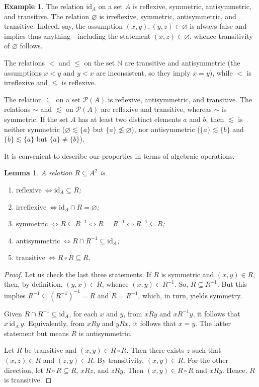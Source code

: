 \documentclass[12pt,notitlepage]{article}
\theoremstyle{plain}
\newtheorem{lemma}[thm]{Lemma}
\theoremstyle{definition}
\newtheorem{exm}[thm]{Example}
\theoremstyle{plain}
\newcommand{\N}{\mathbb{N}}
\newcommand{\sbs}{\subseteq}
\newcommand{\void}{\varnothing}
\newcommand{\mP}{\mathcal{P}}
\newcommand{\id}{\mathrm{id}}
\newcommand{\1}{\mathbf{1}}
\newcommand{\0}{\mathbf{0}}
\begin{document}
\begin{exm}
The relation $\id_A$ on a set $A$ is reflexive, symmetric, antisymmetric, and transitive. The relation $\void$ is irreflexive, symmetric, antisymmetric, and transitive. Indeed, say, the assumption $(x,y), (y,z) \in \void$ is always false and implies thus anything---including the statement $(x,z) \in \void$, whence transitivity of $\void$ follows.


The relations ${<}$ and ${\leq}$ on the set $\N$ are transitive and antisymmetric (the assumptions $x < y$ and $y < x$ are inconsistent, so they imply $x = y$), while ${<}$ is irreflexive and ${\leq}$ is reflexive.

The relation ${\sbs}$ on a set $\mP(A)$ is reflexive, antisymmetric, and transitive. The relations ${\sim}$ and ${\lesssim}$ on $\mP(A)$ are reflexive and transitive, whereas ${\sim}$ is symmetric. If the set $A$ has at least two distinct elements $a$ and $b$, then ${\lesssim}$ is neither symmetric ($\void \lesssim \{a\}$ but $\{a\} \not\lesssim \void$), nor antisymmetric ($\{a\} \lesssim \{b\}$ and $\{b\} \lesssim \{a\}$ but $\{a\} \neq \{b\}$).
\end{exm}

\noindent It is convenient to describe our properties in terms of algebraic operations.
\begin{lemma}
A relation $R \sbs A^2$ is
\begin{enumerate}
\item $\mbox{reflexive}\ \iff \id_A \sbs R$;
\item $\mbox{irreflexive}\ \iff \id_A \cap R = \void$;
\item $\mbox{symmetric}\ \iff R \sbs R^{-1} \iff R = R^{-1} \iff R^{-1} \sbs R$;
\item $\mbox{antisymmetric}\ \iff R \cap R^{-1} \sbs \id_A$;
\item $\mbox{transitive}\ \iff R \circ R \sbs R$.
\end{enumerate}
\end{lemma}
\begin{proof}
Let us check the last three statements. If $R$ is symmetric and $(x,y) \in R$, then, by definition, $(y,x) \in R$, whence $(x,y) \in R^{-1}$. So, $R \sbs R^{-1}$. But this implies $R^{-1} \sbs (R^{-1})^{-1} = R$ and $R = R^{-1}$, which, in turn, yields symmetry.

Given $R \cap R^{-1} \sbs \id_A$, for each $x$ and $y$, from $xRy$ and $x R^{-1} y$, it follows that $x\, \id_A\, y$. Equivalently, from $xRy$ and $y R x$, it follows that $x = y$. The latter statement but means $R$ is antisymmetric.

Let $R$ be transitive and $(x,y) \in R \circ R$. Then there exists $z$ such that $(x,z) \in R$ and $(z,y) \in R$. By transitivity, $(x,y) \in R$. For the other direction, let $R \circ R \sbs R$, $x R z$, and $z R y$. Then $(x,y) \in R \circ R$ and $x R y$. Hence, $R$ is transitive.
\end{proof}
\end{document}
